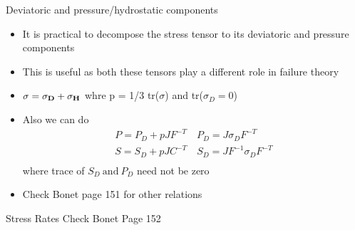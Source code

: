 	\begin{frame}{Deviatoric and pressure/hydrostatic components}
		\begin{itemize}
			\item It is practical to decompose the stress tensor to its deviatoric and pressure components
			\item This is useful as both these tensors play a different role in failure theory
			\item $\mathbf{\sigma = \sigma_D + \sigma_H }$
			whre p = 1/3 tr($\sigma$) and tr($\sigma_D = 0$)
			\item Also we can do 
			\begin{equation}
			\begin{aligned}
			P = P_D + pJF^{-T} \quad P_D =J \sigma_D F^{-T} \\ 
			S = S_D + pJC^{-T} \quad S_D =J F^{-1}\sigma_D F^{-T} \\ 
			\end{aligned}
			\end{equation}
			where trace of $S_D ~\text{and}~ P_D$ need not be zero
			\item Check Bonet page 151 for other relations
		\end{itemize}
	\end{frame}


	\begin{frame}{Stress Rates}
		Check Bonet Page 152
	\end{frame}

